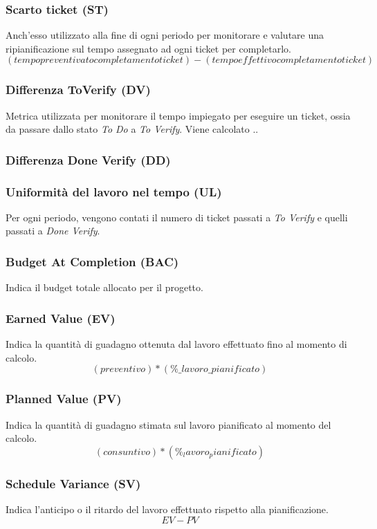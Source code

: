 \subsubsection{Scarto ticket (ST)}
Anch'esso utilizzato alla fine di ogni periodo per monitorare e valutare una ripianificazione sul tempo assegnato ad ogni ticket per completarlo. 
\[
    (tempo preventivato completamento ticket)-(tempo effettivo completamento ticket)
\]

\subsubsection{Differenza ToVerify (DV)}
Metrica utilizzata per monitorare il tempo impiegato per eseguire un ticket, ossia da passare dallo stato \textit{To Do} a \textit{To Verify}. Viene calcolato ..

\subsubsection{Differenza Done Verify (DD)}

\subsubsection{Uniformità del lavoro nel tempo (UL)}
Per ogni periodo, vengono contati il numero di ticket passati a \textit{To Verify} e quelli passati a \textit{Done Verify}.

\subsubsection{Budget At Completion (BAC)}
Indica il budget totale allocato per il progetto.

\subsubsection{Earned Value (EV)}
Indica la quantità di guadagno ottenuta dal lavoro effettuato fino al momento di calcolo.
\[
    (preventivo)*(\%\_lavoro\_pianificato)
\]

\subsubsection{Planned Value (PV)}
Indica la quantità di guadagno stimata sul lavoro pianificato al momento del calcolo.
\[
    (consuntivo)*(\%_lavoro_pianificato)
\]

\subsubsection{Schedule Variance (SV)}
Indica l'anticipo o il ritardo del lavoro effettuato rispetto alla pianificazione.
\[
    EV - PV
\]

